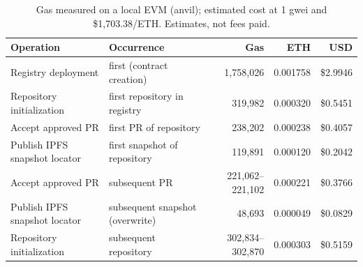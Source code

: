 \begin{table}[t]
\centering\small
\begin{tabular}{llrrr}
\toprule
Operation & Occurrence & Gas & ETH & USD \\
\midrule
Registry deployment & first (contract creation) & 1,758,026 & 0.001758 & \$2.9946 \\
Repository initialization & first repository in registry & 319,982 & 0.000320 & \$0.5451 \\
Accept approved PR & first PR of repository & 238,202 & 0.000238 & \$0.4057 \\
Publish IPFS snapshot locator & first snapshot of repository & 119,891 & 0.000120 & \$0.2042 \\
Accept approved PR & subsequent PR & 221,062--221,102 & 0.000221 & \$0.3766 \\
Publish IPFS snapshot locator & subsequent snapshot (overwrite) & 48,693 & 0.000049 & \$0.0829 \\
Repository initialization & subsequent repository & 302,834--302,870 & 0.000303 & \$0.5159 \\
\bottomrule
\end{tabular}
\caption{Gas measured on a local EVM (anvil); estimated cost at 1 gwei and \$1,703.38/ETH. Estimates, not fees paid.}
\label{tab:gas}
\end{table}
